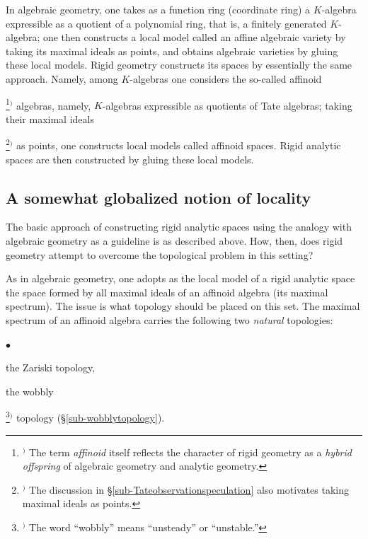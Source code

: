 \documentclass[a4paper,12pt, dvipdfmx]{jsbook}
\renewenvironment{itemize}%
{%
   \begin{list}{\parbox{1zw}{$\bullet$}}%
   {%
      \setlength{\topsep}{.5zh}
      \setlength{\itemindent}{0zw}
      \setlength{\leftmargin}{3zw}%
      \setlength{\rightmargin}{0zw}%
      \setlength{\labelsep}{.5zw}%
      \setlength{\labelwidth}{3zw}%
      \setlength{\itemsep}{0.2em}%
      \setlength{\parsep}{0em}%
      \setlength{\listparindent}{0zw}%
   }
}{%
   \end{list}%
}
\theoremstyle{plain}
\theoremstyle{definition}
\newcounter{chushaku}
\def\chu#1{\addtocounter{chushaku}{1}\footnote[\value{chushaku}]{${}^)$ #1}${}^)$}
\begin{document}
In algebraic geometry, one takes as a function ring (coordinate ring) a $K$-algebra expressible as a quotient of a polynomial ring, that is, a finitely generated $K$-algebra; one then constructs a local model called an affine algebraic variety by taking its maximal ideals as points, and obtains algebraic varieties by gluing these local models.
Rigid geometry constructs its spaces by essentially the same approach.
Namely, among $K$-algebras one considers the so-called affinoid\chu{The term {\it affinoid} itself reflects the character of rigid geometry as a {\it hybrid offspring} of algebraic geometry and analytic geometry.} algebras, namely, $K$-algebras expressible as quotients of Tate algebras; taking their maximal ideals\chu{The discussion in \S\ref{sub-Tateobservationspeculation} also motivates taking maximal ideals as points.} as points, one constructs local models called affinoid spaces.
Rigid analytic spaces are then constructed by gluing these local models.

\subsection{A somewhat globalized notion of locality}\label{sub-topologyproblem}
The basic approach of constructing rigid analytic spaces using the analogy with algebraic geometry as a guideline is as described above.
How, then, does rigid geometry attempt to overcome the topological problem in this setting?

As in algebraic geometry, one adopts as the local model of a rigid analytic space the space formed by all maximal ideals of an affinoid algebra (its maximal spectrum). The issue is what topology should be placed on this set.
The maximal spectrum of an affinoid algebra carries the following two {\it natural} topologies:
\begin{itemize}
\item[(a)] the Zariski topology,
\item[(b)] the wobbly\chu{The word ``wobbly'' means ``unsteady'' or ``unstable.''} topology (\S\ref{sub-wobblytopology}).
\end{itemize}
\end{document}
